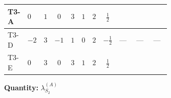 \documentclass[8pt]{article}
\begin{document}
\begin{landscape}
\begin{longtable}{@{}llcccccc >{\raggedright\arraybackslash}p{0.21\linewidth} >{\raggedright\arraybackslash}p{0.21\linewidth} >{\raggedright\arraybackslash}p{0.21\linewidth}@{}}
\midrule
T3-A & $0$ & $1$ & $0$ & $3$ & $1$ & $2$ & $\frac{1}{2}$ & \scriptsize\adjustbox{max width=\linewidth}{$\begin{gathered} {\lambda_{S_2}^{(1)}} \left(\frac{1}{2} T_{\nu}^{(2)}+13 {\lambda_{S_2}^{(A)}}\right)\end{gathered}$} & \scriptsize\adjustbox{max width=\linewidth}{$\begin{gathered} +4 {\lambda_{S_2}^{(A)}} T_{\nu}^{(2)}\end{gathered}$} & \scriptsize\adjustbox{max width=\linewidth}{$\begin{gathered} -\operatorname{Tr}\!\left({y_2}\,\left({y_2}\right)^{\dagger}\,{y_2}\,\left({y_2}\right)^{\dagger}\right)\end{gathered}$} \\
\midrule
T3-D & $-2$ & $3$ & $-1$ & $1$ & $0$ & $2$ & $-\frac{1}{2}$ & --- & --- & --- \\
\midrule
T3-E & $0$ & $3$ & $0$ & $3$ & $1$ & $2$ & $\frac{1}{2}$ & \scriptsize\adjustbox{max width=\linewidth}{$\begin{gathered} {\lambda_{S_2}^{(1)}} \left(\frac{1}{2} T_{\nu}^{(2)}+13 {\lambda_{S_2}^{(A)}}\right)\end{gathered}$} & \scriptsize\adjustbox{max width=\linewidth}{$\begin{gathered} +4 {\lambda_{S_2}^{(A)}} T_{\nu}^{(2)}\end{gathered}$} & \scriptsize\adjustbox{max width=\linewidth}{$\begin{gathered} -\operatorname{Tr}\!\left({y_2}\,\left({y_2}\right)^{\dagger}\,{y_2}\,\left({y_2}\right)^{\dagger}\right)\end{gathered}$} \\
\midrule
\bottomrule
\end{longtable}
\clearpage
\noindent\textbf{Quantity: }$\lambda_{S_2}^{(A)}$\par\smallskip

\end{landscape}
\end{document}
